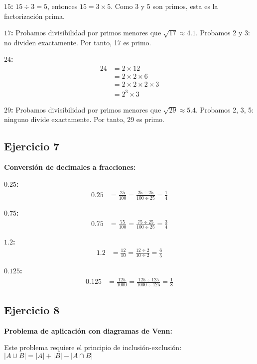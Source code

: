 \textbf{$15$:} $15 \div 3 = 5$, entonces $15 = 3 \times 5$. Como 3 y 5 son primos, esta es la factorización prima.

\textbf{$17$:} Probamos divisibilidad por primos menores que $\sqrt{17} \approx 4.1$. Probamos 2 y 3: no dividen exactamente. Por tanto, 17 es primo.

\textbf{$24$:} 
\begin{align}
24 &= 2 \times 12 \\
&= 2 \times 2 \times 6 \\
&= 2 \times 2 \times 2 \times 3 \\
&= 2^3 \times 3
\end{align}

\textbf{$29$:} Probamos divisibilidad por primos menores que $\sqrt{29} \approx 5.4$. Probamos 2, 3, 5: ninguno divide exactamente. Por tanto, 29 es primo.

\subsection*{Ejercicio 7}

\textbf{Conversión de decimales a fracciones:}

\textbf{$0.25$:} 
\begin{align}
0.25 &= \frac{25}{100} = \frac{25 \div 25}{100 \div 25} = \frac{1}{4}
\end{align}

\textbf{$0.75$:}
\begin{align}
0.75 &= \frac{75}{100} = \frac{75 \div 25}{100 \div 25} = \frac{3}{4}
\end{align}

\textbf{$1.2$:}
\begin{align}
1.2 &= \frac{12}{10} = \frac{12 \div 2}{10 \div 2} = \frac{6}{5}
\end{align}

\textbf{$0.125$:}
\begin{align}
0.125 &= \frac{125}{1000} = \frac{125 \div 125}{1000 \div 125} = \frac{1}{8}
\end{align}

\subsection*{Ejercicio 8}

\textbf{Problema de aplicación con diagramas de Venn:}

Este problema requiere el principio de inclusión-exclusión: $|A \cup B| = |A| + |B| - |A \cap B|$


